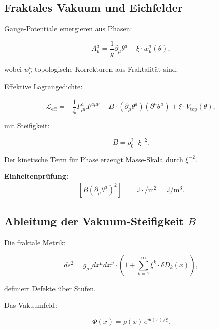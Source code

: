 	\subsection*{Fraktales Vakuum und Eichfelder}
	
	Gauge-Potentiale emergieren aus Phasen:
	
	\begin{equation}
		A_\mu^a = \frac{1}{g} \partial_\mu \theta^a + \xi \cdot w_\mu^a(\theta),
	\end{equation}
	
	wobei \(w_\mu^a\) topologische Korrekturen aus Fraktalität sind.
	
	Effektive Lagrangedichte:
	
	\begin{equation}
		\mathcal{L}_{\text{eff}} = -\frac{1}{4} F_{\mu\nu}^a F^{a\mu\nu} + B \cdot (\partial_\mu \theta^a)(\partial^\mu \theta^a) + \xi \cdot V_{\text{top}}(\theta),
	\end{equation}
	
	mit Steifigkeit:
	
	\begin{equation}
		B = \rho_0^2 \cdot \xi^{-2}.
	\end{equation}
	
	Der kinetische Term für Phase erzeugt Masse-Skala durch \(\xi^{-2}\).
	
	\textbf{Einheitenprüfung:}
	\[
	\begin{aligned}
		[B (\partial_\mu \theta^a)^2] &= \si{\joule} \cdot \si{\per\meter^2} = \si{\joule\per\meter^3}.
	\end{aligned}
	\]
	
	\subsection*{Ableitung der Vakuum-Steifigkeit \(B\)}
	
	Die fraktale Metrik:
	
	\begin{equation}
		ds^2 = g_{\mu\nu} dx^\mu dx^\nu \cdot \left(1 + \sum_{k=1}^\infty \xi^k \cdot \delta D_k(x)\right),
	\end{equation}
	
	definiert Defekte über Stufen.
	
	Das Vakuumfeld:
	
	\begin{equation}
		\Phi(x) = \rho(x) \, e^{i \theta(x)/\xi}.
	\end{equation}
	
